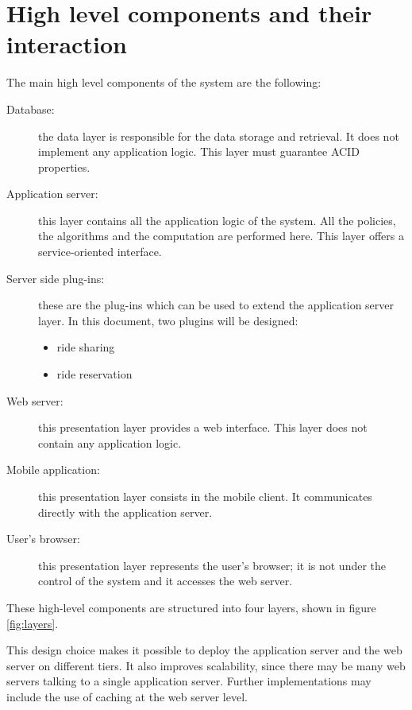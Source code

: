 \section{High level components and their interaction}
\label{sec:high-level}

The main high level components of the system are the following:
\begin{description}
	\item[Database:] the data layer is responsible for the data storage and retrieval. It does not implement any application logic. This layer must guarantee ACID properties.
	\item[Application server:] this layer contains all the application logic of the system. All the policies, the algorithms and the computation are performed here. This layer offers a service-oriented interface.
	\item[Server side plug-ins:] these are the plug-ins which can be used to extend the application server layer. In this document, two plugins will be designed:
		\begin{itemize}
		\item ride sharing
		\item ride reservation
		\end{itemize}
	\item[Web server:] this presentation layer provides a web interface. This layer does not contain any application logic.
	\item[Mobile application:] this presentation layer consists in the mobile client. It communicates directly with the application server.
	\item[User's browser:] this presentation layer represents the user's browser; it is not under the control of the system and it accesses the web server.
\end{description}

These high-level components are structured into four layers, shown in figure \ref{fig:layers}.

This design choice makes it possible to deploy the application server and the web server on different tiers. It also improves scalability, since there may be many web servers talking to a single application server. Further implementations may include the use of caching at the web server level.

